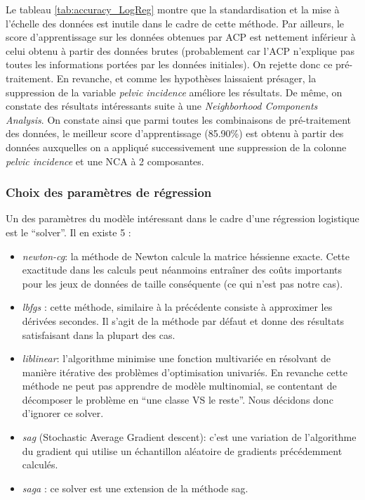 \documentclass[twocolumn,10pt]{article}
\begin{document}
Le tableau \ref{tab:accuracy_LogReg} montre que la standardisation et la mise à l'échelle des données est inutile dans le cadre de cette méthode. Par ailleurs, le score d'apprentissage sur les données obtenues par ACP est nettement inférieur à celui obtenu à partir des données brutes (probablement car l'ACP n'explique pas toutes les informations portées par les données initiales). On rejette donc ce pré-traitement. En revanche, et comme les hypothèses laissaient présager, la suppression de la variable \textit{pelvic incidence} améliore les résultats. De même, on constate des résultats intéressants suite à une \textit{Neighborhood Components Analysis}. On constate ainsi que parmi toutes les combinaisons de pré-traitement des données, le meilleur score d'apprentissage (85.90\%) est obtenu à partir des données auxquelles on a appliqué successivement une suppression de la colonne \textit{pelvic incidence} et une NCA à 2 composantes.

\subsubsection{Choix des paramètres de régression}

Un des paramètres du modèle intéressant dans le cadre d'une régression logistique est le "`solver"'. Il en existe 5 :
\begin{itemize}
	\item \textit{newton-cg}: la méthode de Newton calcule la matrice héssienne exacte. Cette exactitude dans les calculs peut néanmoins entraîner des coûts importants pour les jeux de données de taille conséquente (ce qui n'est pas notre cas).
    \item \textit{lbfgs} : cette méthode, similaire à la précédente consiste à approximer les dérivées secondes. Il s'agit de la méthode par défaut et donne des résultats satisfaisant dans la plupart des cas.
    \item \textit{liblinear}: l'algorithme minimise une fonction multivariée en résolvant de manière itérative des problèmes d'optimisation univariés. En revanche cette méthode ne peut pas apprendre de modèle multinomial, se contentant de décomposer le problème en "`une classe VS le reste"'. Nous décidons donc d'ignorer ce solver.
    \item \textit{sag} (Stochastic Average Gradient descent): c'est une variation de l'algorithme du gradient qui utilise un échantillon aléatoire de gradients précédemment calculés.
    \item \textit{saga} : ce solver est une extension de la méthode sag.

\end{itemize}
\end{document}
